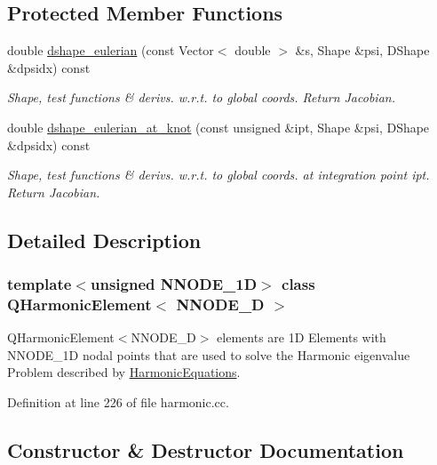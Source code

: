 \subsection*{Protected Member Functions}
\begin{DoxyCompactItemize}
\item 
double \hyperlink{classQHarmonicElement_a206b7334e82cb563d7d575deb9f755b1}{dshape\+\_\+eulerian} (const Vector$<$ double $>$ \&s, Shape \&psi, D\+Shape \&dpsidx) const
\begin{DoxyCompactList}\small\item\em Shape, test functions \& derivs. w.\+r.\+t. to global coords. Return Jacobian. \end{DoxyCompactList}\item 
double \hyperlink{classQHarmonicElement_a6b11b5a42bd20c4e1d1e9840ba22a80a}{dshape\+\_\+eulerian\+\_\+at\+\_\+knot} (const unsigned \&ipt, Shape \&psi, D\+Shape \&dpsidx) const
\begin{DoxyCompactList}\small\item\em Shape, test functions \& derivs. w.\+r.\+t. to global coords. at integration point ipt. Return Jacobian. \end{DoxyCompactList}\end{DoxyCompactItemize}


\subsection{Detailed Description}
\subsubsection*{template$<$unsigned N\+N\+O\+D\+E\+\_\+1D$>$\newline
class Q\+Harmonic\+Element$<$ N\+N\+O\+D\+E\+\_\+D $>$}

Q\+Harmonic\+Element$<$\+N\+N\+O\+D\+E\+\_\+D$>$ elements are 1D Elements with N\+N\+O\+D\+E\+\_\+1D nodal points that are used to solve the Harmonic eigenvalue Problem described by \hyperlink{classHarmonicEquations}{Harmonic\+Equations}. 

Definition at line 226 of file harmonic.\+cc.



\subsection{Constructor \& Destructor Documentation}
\mbox{\label{classQHarmonicElement_a0e7480a0064b51e87ba197551bb10373}} 
